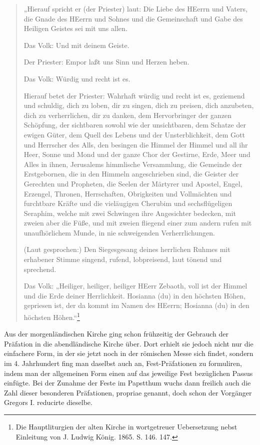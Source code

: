 \begin{quote}
„Hierauf spricht er (der Priester) laut: Die Liebe des HEerrn und Vaters, die Gnade des HEerrn und Sohnes und die Gemeinschaft und Gabe des Heiligen Geistes sei mit uns allen.

Das Volk: Und mit deinem Geiste.

Der Priester: Empor laßt uns Sinn und Herzen heben.

Das Volk: Würdig und recht ist es.

Hierauf betet der Priester: Wahrhaft würdig und recht ist es, geziemend und schuldig, dich zu loben, dir zu singen, dich zu preisen, dich anzubeten, dich zu verherrlichen, dir zu danken, dem Hervorbringer der ganzen Schöpfung, der sichtbaren sowohl wie der unsichtbaren, dem Schatze der ewigen Güter, dem Quell des Lebens und der Unsterblichkeit, dem Gott und Herrscher des Alls, den besingen die Himmel der Himmel und all ihr Heer, Sonne und Mond und der ganze Chor der Gestirne, Erde, Meer und Alles in ihnen, Jerusalems himmlische Versammlung, die Gemeinde der Erstgebornen, die in den Himmeln angeschrieben sind, die Geister der Gerechten und Propheten, die Seelen der Märtyrer und Apostel, Engel, Erzengel, Thronen, Herrschaften, Obrigkeiten und Vollmächten und furchtbare Kräfte und die vieläugigen Cherubim und sechsflügeligen Seraphim, welche mit zwei Schwingen ihre Angesichter
bedecken, mit zweien aber die Füße, und mit zweien fliegend einer zum andern rufen mit unaufhörlichem Munde, in nie schweigenden Verherrlichungen.

(Laut gesprochen:) Den Siegesgesang deines herrlichen Ruhmes mit erhabener Stimme singend, rufend, lobpreisend, laut tönend und sprechend.

Das Volk: „Heiliger, heiliger, heiliger HEerr Zebaoth, voll ist der Himmel und die Erde deiner Herrlichkeit. Hosianna (du) in den höchsten Höhen, gepriesen ist, der da kommt im Namen des HEerrn; Hosianna (du) in den höchsten Höhen.“\footnote{Die Hauptliturgien der alten Kirche in wortgetreuer Uebersetzung nebst Einleitung von J. Ludwig König. 1865. S. 146. 147.}
\end{quote}

Aus der morgenländischen Kirche ging schon frühzeitig der Gebrauch der Präfation in die abendländische Kirche über. Dort erhielt sie jedoch nicht nur die einfachere Form, in der sie jetzt noch in der römischen Messe sich findet, sondern im 4. Jahrhundert fing man daselbst auch an, Fest-Präfationen zu formuliren, indem man der allgemeinen Form einen auf das jeweilige Fest bezüglichen Passus einfügte. Bei der Zunahme der Feste im Papstthum wuchs dann freilich auch die Zahl dieser besonderen Präfationen, propriae genannt, doch schon der Vorgänger Gregors I. reducirte dieselbe.

